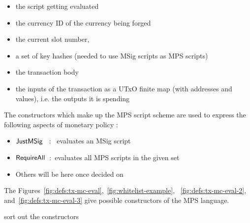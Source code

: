 \begin{itemize}
\item the script getting evaluated
\item the currency ID of the currency being forged
\item the current slot number,
\item a set of key hashes (needed to use MSig scripts as MPS scripts)
\item the transaction body
\item the inputs of the transaction as a UTxO finite map (with addresses and values),
i.e. the outputs it is spending
\end{itemize}

The constructors which make up the MPS script scheme are used to express the following
aspects of monetary policy :

\begin{itemize}
\item $\mathsf{JustMSig}$~ :~ evaluates an MSig script

\item $\mathsf{RequireAll}$~:~evaluates all MPS scripts in the given set

\item Others will be here once decided on
\end{itemize}

The Figures~\ref{fig:defs:tx-mc-eval},~\ref{fig:whitelist-example},
~\ref{fig:defs:tx-mc-eval-2}, and~\ref{fig:defs:tx-mc-eval-3} give
possible constructors of the MPS language.

\begin{note}
  sort out the constructors
\end{note}

